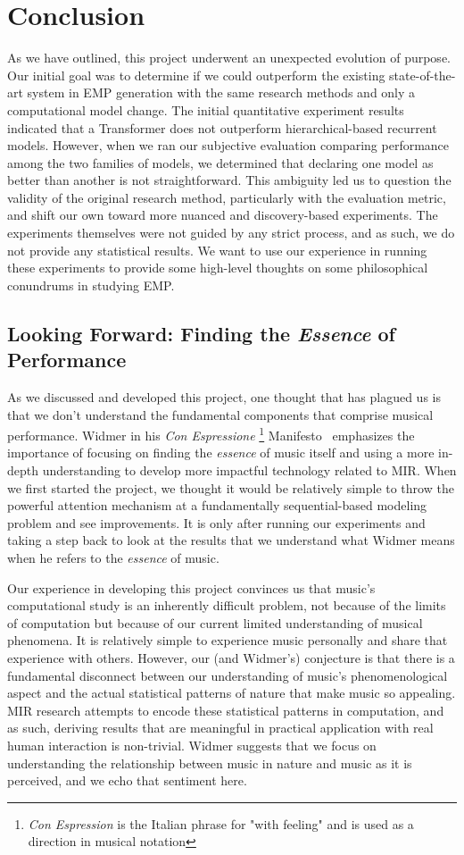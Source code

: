 \chapter{Conclusion} \label{ch:ch8}
As we have outlined, this project underwent an unexpected evolution of purpose. Our initial goal was to determine if we could outperform the existing state-of-the-art system in EMP generation with the same research methods and only a computational model change. The initial quantitative experiment results indicated that a Transformer does not outperform hierarchical-based recurrent models. However, when we ran our subjective evaluation comparing performance among the two families of models, we determined that declaring one model as better than another is not straightforward. This ambiguity led us to question the validity of the original research method, particularly with the evaluation metric, and shift our own toward more nuanced and discovery-based experiments. The experiments themselves were not guided by any strict process, and as such, we do not provide any statistical results. We want to use our experience in running these experiments to provide some high-level thoughts on some philosophical conundrums in studying EMP. 

\section{Looking Forward: Finding the \emph{Essence} of Performance}
As we discussed and developed this project, one thought that has plagued us is that we don't understand the fundamental components that comprise musical performance. Widmer in his \emph{Con Espressione}%
\footnote{\emph{Con Espression} is the Italian phrase for "with feeling" and is used as a direction in musical notation}%
Manifesto~\cite{widmer2016getting} emphasizes the importance of focusing on finding the \emph{essence} of music itself and using a more in-depth understanding to develop more impactful technology related to MIR. When we first started the project, we thought it would be relatively simple to throw the powerful attention mechanism at a fundamentally sequential-based modeling problem and see improvements. It is only after running our experiments and taking a step back to look at the results that we understand what Widmer means when he refers to the \emph{essence} of music. 

Our experience in developing this project convinces us that music's computational study is an inherently difficult problem, not because of the limits of computation but because of our current limited understanding of musical phenomena. It is relatively simple to experience music personally and share that experience with others. However, our (and Widmer's) conjecture is that there is a fundamental disconnect between our understanding of music's phenomenological aspect and the actual statistical patterns of nature that make music so appealing. MIR research attempts to encode these statistical patterns in computation, and as such, deriving results that are meaningful in practical application with real human interaction is non-trivial. Widmer suggests that we focus on understanding the relationship between music in nature and music as it is perceived, and we echo that sentiment here. 

